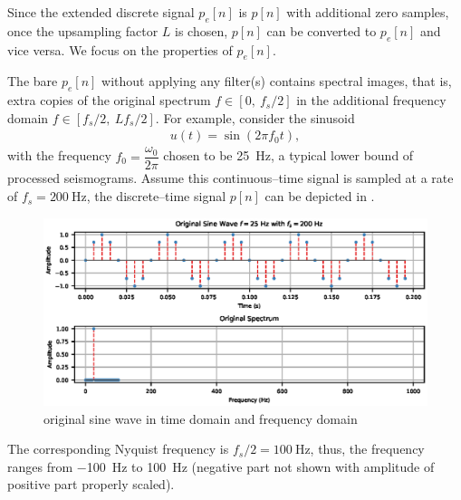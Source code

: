 Since the extended discrete signal $p_e[n]$ is $p[n]$ with additional zero samples, once the upsampling factor $L$ is chosen, $p[n]$ can be converted to $p_e[n]$ and vice versa. We focus on the properties of $p_e[n]$.

The bare $p_e[n]$ without applying any filter(s) contains spectral images, that is, extra copies of the original spectrum $f\in[0,~f_s/2]$ in the additional frequency domain $f\in[f_s/2,~Lf_s/2]$. For example, consider the sinusoid
\begin{gather}
u(t)=\sin\left(2\pi{}f_0t\right),
\end{gather}
with the frequency $f_0=\dfrac{\omega_0}{2\pi}$ chosen to be \SI{25}{\hertz}, a typical lower bound of processed seismograms. Assume this continuous--time signal is sampled at a rate of $f_s=\SI{200}{\hertz}$, the discrete--time signal $p[n]$ can be depicted in .
\begin{figure}[htb!]
\centering
\includegraphics{PIC/PureSineOrigin}
\caption{original sine wave in time domain and frequency domain}\label{fig:original}
\end{figure}
The corresponding Nyquist frequency is $f_s/2=\SI{100}{\hertz}$, thus, the frequency ranges from \SI{-100}{\hertz} to \SI{100}{\hertz} (negative part not shown with amplitude of positive part properly scaled).

